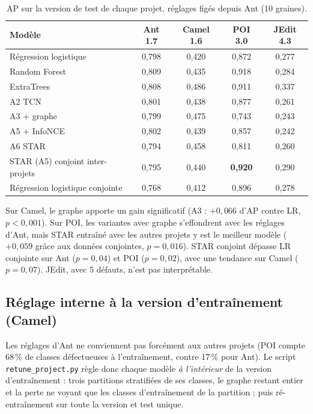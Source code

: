 \documentclass[11pt,a4paper,openany]{report}
\newcommand{\code}[1]{\texttt{\small #1}}
\newcommand{\best}[1]{\textbf{\color{primary}#1}}
\begin{document}
\begin{table}[H]
\centering\small
\caption{AP sur la version de test de chaque projet, réglages figés depuis Ant (10 graines).}
\label{tab:transfer}
\begin{tabular}{lcccc}
\toprule
\textbf{Modèle} & \textbf{Ant 1.7} & \textbf{Camel 1.6} & \textbf{POI 3.0} & \textbf{JEdit 4.3} \\
\midrule
Régression logistique         & 0,798 & 0,420 & 0,872 & 0,277 \\
Random Forest                 & 0,809 & 0,435 & 0,918 & 0,284 \\
ExtraTrees                    & 0,808 & 0,486 & 0,911 & 0,337 \\
A2 TCN                        & 0,801 & 0,438 & 0,877 & 0,261 \\
A3 + graphe                   & 0,799 & 0,475 & 0,743 & 0,243 \\
A5 + InfoNCE                  & 0,802 & 0,439 & 0,857 & 0,242 \\
A6 STAR                       & 0,794 & 0,458 & 0,811 & 0,260 \\
STAR (A5) conjoint inter-projets & 0,795 & 0,440 & \best{0,920} & 0,290 \\
Régression logistique conjointe  & 0,768 & 0,412 & 0,896 & 0,278 \\
\bottomrule
\end{tabular}
\end{table}

Sur Camel, le graphe apporte un gain significatif (A3 : $+0{,}066$ d'AP contre LR, $p<0{,}001$). Sur POI, les variantes
avec graphe s'effondrent avec les réglages d'Ant, mais STAR entraîné avec les autres projets y est le meilleur modèle
($+0{,}059$ grâce aux données conjointes, $p=0{,}016$). STAR conjoint dépasse LR conjointe sur Ant ($p=0{,}04$) et POI
($p=0{,}02$), avec une tendance sur Camel ($p=0{,}07$). JEdit, avec 5 défauts, n'est pas interprétable.

\subsection{Réglage interne à la version d'entraînement (Camel)}
Les réglages d'Ant ne conviennent pas forcément aux autres projets (POI compte 68\,\% de classes défectueuses à
l'entraînement, contre 17\,\% pour Ant). Le script \code{retune\_project.py} règle donc chaque modèle \emph{à
l'intérieur} de la version d'entraînement : trois partitions stratifiées de ses classes, le graphe restant entier et la
perte ne voyant que les classes d'entraînement de la partition ; puis ré-entraînement sur toute la version et test
unique.
\end{document}
